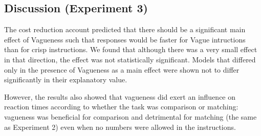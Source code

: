 \subsection{Discussion (Experiment 3)}

The cost reduction account predicted that there should be a significant main effect of Vagueness such that responses would be faster for Vague intructions than for crisp instructions. We found that although there was a very small effect in that direction, the effect was not statistically significant. Models that differed only in the presence of Vagueness as a main effect were shown not to differ significantly in their explanatory value. 

However, the results also showed that vagueness did exert an influence on reaction times according to whether the task was comparison or matching: vagueness was beneficial for comparison and detrimental for matching (the same as Experiment 2) even when no numbers were allowed in the instructions. 
